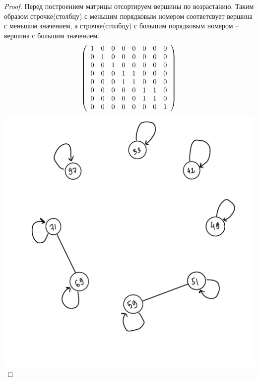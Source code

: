\begin{proof}
Перед построением матрицы отсортируем вершины по возрастанию. Таким образом строчке(столбцу) с меньшим порядковым номером соответсвует вершина с меньшим значением, а строчке(столбцу) с большим порядковым номером -- вершина с большим значением.
	$$ \left( \begin{array}{c c c c c c c c } 
 
 1 & 0 & 0 & 0 & 0 & 0 & 0 & 0 \\ 

 0 & 1 & 0 & 0 & 0 & 0 & 0 & 0 \\

 0 & 0 & 1 & 0 & 0 & 0 & 0 & 0 \\
 
 0 & 0 & 0 & 1 & 1 & 0 & 0 & 0 \\
 
 0 & 0 & 0 & 1 & 1 & 0 & 0 & 0 \\
 
 0 & 0 & 0 & 0 & 0 & 1 & 1 & 0 \\
 
 0 & 0 & 0 & 0 & 0 & 1 & 1 & 0 \\
 
 0 & 0 & 0 & 0 & 0 & 0 & 0 & 1  \end {array} \right) $$
 \includegraphics{граф5.png}
\end{proof}

